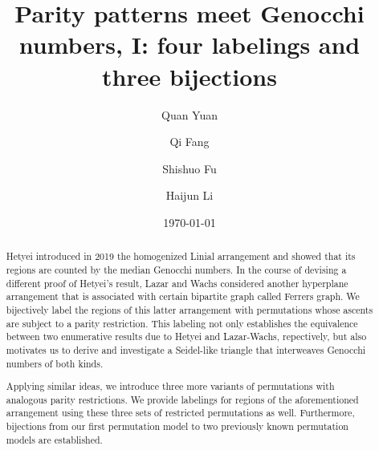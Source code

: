 \documentclass[11pt,reqno]{amsart}
\numberwithin{equation}{section}
\theoremstyle{plain}
\theoremstyle{definition}
\begin{document}
\title[Parity patterns meet Genocchi numbers, I.]{Parity patterns meet Genocchi numbers, I: four labelings and three bijections}


\author[Q. Yuan]{Quan Yuan}
\address[Quan Yuan]{College of Mathematics and Statistics, Chongqing University, Chongqing 401331, P.R. China}



\author[Q. Fang]{Qi Fang}
\address[Qi Fang]{College of Mathematics and Statistics, Chongqing University, Chongqing 401331, P.R. China}


\author[S. Fu]{Shishuo Fu} 
\address[Shishuo Fu]{College of Mathematics and Statistics, Chongqing University \& Key Laboratory of Nonlinear Analysis and its Applications (Chongqing University), Ministry of Education, Chongqing 401331, P.R. China}


\author[H. Li]{Haijun Li}
\address[Haijun Li]{College of Mathematics and Statistics, Chongqing University, Chongqing 401331, P.R. China}

\date{\today}

\begin{abstract}
Hetyei introduced in 2019 the homogenized Linial arrangement and showed that its regions are counted by the median Genocchi numbers. In the course of devising a different proof of Hetyei's result, Lazar and Wachs considered another hyperplane arrangement that is associated with certain bipartite graph called Ferrers graph. We bijectively label the regions of this latter arrangement with permutations whose ascents are subject to a parity restriction. This labeling not only establishes the equivalence between two enumerative results due to Hetyei and Lazar-Wachs, repectively, but also motivates us to derive and investigate a Seidel-like triangle that interweaves Genocchi numbers of both kinds. 

Applying similar ideas, we introduce three more variants of permutations with analogous parity restrictions. We provide labelings for regions of the aforementioned arrangement using these three sets of restricted permutations as well. Furthermore, bijections from our first permutation model to two previously known permutation models are established.
\end{abstract}

\end{document}
